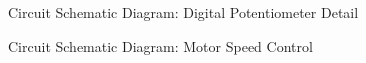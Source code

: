 \documentclass[a4]{report}
\begin{document}
	\begin{figure}[!h]
		\centering
		\caption{Circuit Schematic Diagram: Digital Potentiometer Detail}
		\label{circdigpotclose}
	\end{figure} \newline  \noindent
	\begin{figure}[!h]
		\centering
		\caption{Circuit Schematic Diagram: Motor Speed Control}
		\label{circspeedcontr}
	\end{figure} \newline  \noindent
\end{document}
